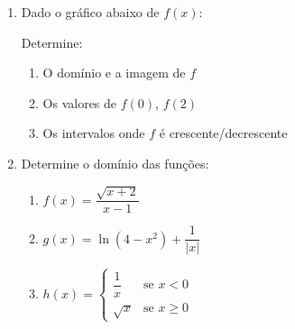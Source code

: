 \documentclass[12pt,a4paper]{article}
\begin{document}
\begin{enumerate}

\item Dado o gráfico abaixo de $f(x)$:
\begin{center}
\end{center}
Determine:
\begin{enumerate}
    \item O domínio e a imagem de $f$
    \item Os valores de $f(0)$, $f(2)$
    \item Os intervalos onde $f$ é crescente/decrescente
\end{enumerate}



\item Determine o domínio das funções:
\begin{enumerate}
    \item $f(x) = \dfrac{\sqrt{x+2}}{x-1}$
    \item $g(x) = \ln(4 - x^2) + \dfrac{1}{|x|}$
    \item $h(x) = \begin{cases} 
      \dfrac{1}{x} & \text{se } x < 0 \\ 
      \sqrt{x} & \text{se } x \geq 0 
    \end{cases}$
\end{enumerate}


\end{enumerate}
\end{document}
